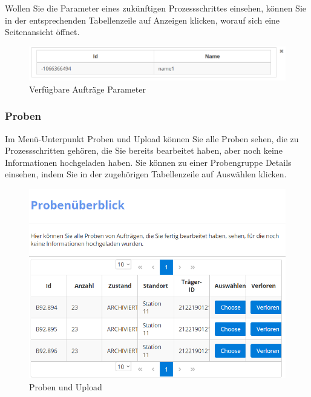 \documentclass[enabledeprecatedfontcommands,fontsize=12pt,paper=a4,twoside]{scrartcl}
\begin{document}
Wollen Sie die Parameter eines zukünftigen Prozessschrittes einsehen, können Sie in der entsprechenden Tabellenzeile auf Anzeigen klicken, worauf sich eine Seitenansicht öffnet. \\

\begin{figure}[h!]
\begin{center}
 \includegraphics[width=\textwidth]{screenshots/t/verfugbareauftrageparameter.png}
  \caption{Verfügbare Aufträge Parameter}
  \label{fig:boat1}
\end{center}
\end{figure}

\subsubsection{Proben}
Im Menü-Unterpunkt Proben und Upload können Sie alle Proben sehen, die zu Prozessschritten gehören, die Sie bereits bearbeitet haben, aber noch keine Informationen hochgeladen haben. Sie können zu einer Probengruppe Details einsehen, indem Sie in der zugehörigen Tabellenzeile auf Auswählen klicken.\\

\begin{figure}[h!]
\begin{center}
 \includegraphics[width=\textwidth]{screenshots/t/probenupload.png}
  \caption{Proben und Upload}
  \label{fig:boat1}
\end{center}
\end{figure}
\end{document}
